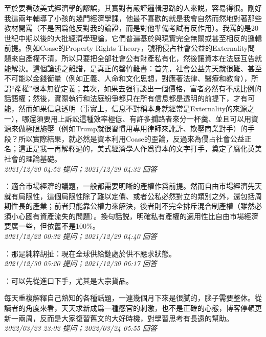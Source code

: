 \documentclass[twocolumn]{ctexart}
\begin{document}
至於要看破美式經濟學的謬誤，其實對有嚴謹邏輯思路的人來説，容易得很。剛好我這兩年輔導了小孩的幾門經濟學課，他最不喜歡的就是我會自然而然地對著那些教材開罵（不是因爲他反對我的論證，而是對他準備考試有反作用）。我罵的是20世紀中期以後的大批經濟學理論，它們普遍基於與現實完全無關或甚至相反的邏輯前提。例如Coase的Property Rights Theory，號稱侵占社會公益的Externality問題來自產權不清，所以只要把全部社會公有財產私有化，然後讓資本在法庭互告就能解決。這個論述之離譜，是真正的罄竹難書：首先，社會公益先天就很難、甚至不可能以金錢衡量（例如正義、人命和文化思想，對應著法律、醫療和教育），所謂“產權”根本無從定義；其次，如果去强行談出一個價格，富者必然有不成比例的話語權；然後，實際執行和法庭紛爭都只在所有信息都是透明的前提下，才有可能，然而如果信息透明（事實上，信息不對稱本身就經常是Externality的來源之一），哪還須要用上訴訟這種效率極低、有許多攔路者來分一杯羹、並且可以用資源來做極限施壓（例如Trump就很習慣用專用律師來訛詐、欺壓商業對手）的手段？所以實際結果，就必然是資本利用Coase的歪論，反過來為侵占社會公益正名；這正是我一再解釋過的，美式經濟學人作爲資本的文字打手，奠定了腐化英美社會的理論基礎。
\\

\textit{\hfill\noindent\small 2021/12/20 04:52 提问；2021/12/29 04:32 回答}

：適合市場經濟的議題，一般都需要明晰的產權作爲前提。然而自由市場經濟先天就有局限性，這個局限性除了難以定價、或者公私必然對立的類別之外，還包括周期性長的產業；前者只能靠公權力來解決，後者則不完全排斥混合制產權（雖然必須小心國有資產流失的問題）。換句話説，明確私有產權的適用性比自由市場經濟要廣一些，但依舊不是100\%。
\\

\textit{\hfill\noindent\small 2021/12/22 00:32 提问；2021/12/29 04:40 回答}

：那是純粹胡扯：現在全球供給鏈處於供不應求狀態。
\\

\textit{\hfill\noindent\small 2021/12/30 05:20 提问；2021/12/30 06:17 回答}

：可以先從進口下手，尤其是大宗貨品。

每天重複解釋自己熟知的各種話題，一連幾個月下來是很膩的，腦子需要整休。從讀者的角度來看，天天求新成爲一種感官的刺激，也不是正確的心態，博客停頓更新一兩周，反而是大家復習舊文的大好時機，對學習思考有長遠的幫助。
\\

\textit{\hfill\noindent\small 2022/03/23 23:02 提问；2022/03/24 05:55 回答}
\end{document}
